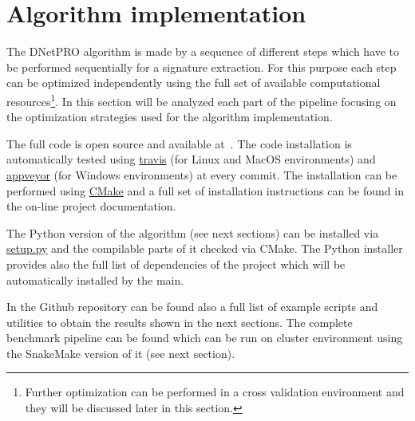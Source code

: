 \documentclass{standalone}
\begin{document}
\section[DNetPRO Implementation]{Algorithm implementation}\label{implementation:implementation}

The DNetPRO algorithm is made by a sequence of different steps which have to be performed sequentially for a signature extraction.
For this purpose each step can be optimized independently using the full set of available computational resources\footnote{
Further optimization can be performed in a cross validation environment and they will be discussed later in this section.
}.
In this section will be analyzed each part of the pipeline focusing on the optimization strategies used for the algorithm implementation.

The full code is open source and available at~\cite{DNetPRO}.
The code installation is automatically tested using \href{https://github.com/Nico-Curti/DNetPRO/blob/master/.travis.yml
}{\textsf{travis}} (for Linux and MacOS environments) and \href{https://github.com/Nico-Curti/DNetPRO/blob/master/appveyor.yml}{\textsf{appveyor}} (for Windows environments) at every commit.
The installation can be performed using \href{https://github.com/Nico-Curti/DNetPRO/blob/master/CMakeLists.txt}{\textsf{CMake}} and a full set of installation instructions can be found in the on-line project documentation.

The Python version of the algorithm (see next sections) can be installed via \href{https://github.com/Nico-Curti/DNetPRO/blob/master/setup.py}{\textsf{setup.py}} and the compilable parts of it checked via \textsf{CMake}.
The Python installer provides also the full list of dependencies of the project which will be automatically installed by the main.

In the Github repository can be found also a full list of example scripts and utilities to obtain the results shown in the next sections.
The complete benchmark pipeline can be found which can be run on cluster environment using the \textsf{SnakeMake} version of it (see next section).
\end{document}
